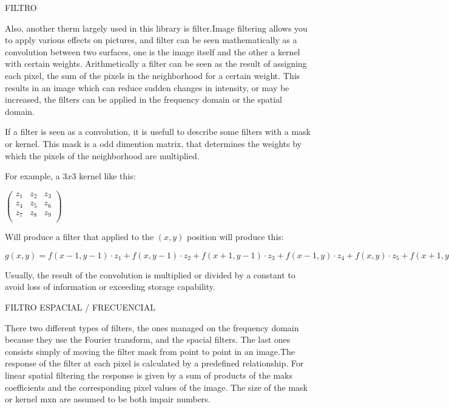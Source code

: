 \documentclass[a4paper]{article}
\begin{document}
FILTRO

Also, another therm largely used in this library is filter.Image filtering allows you to apply various effects on pictures, and filter can be seen mathematically as a convolution between two surfaces, one is the image itself and the other a kernel with certain weights.  Arithmetically a filter can be seen as the result of assigning each pixel, the sum of the pixels in the neighborhood for a certain weight. This results in an image which can reduce sudden changes in intensity, or may be increased, the filters can be applied in the frequency domain or the spatial domain. 

If a filter is seen as a convolution, it is usefull to describe some filters with a mask or kernel. This mask is a odd dimention matrix, that determines the weights by which the pixels of the neighborhood are multiplied.

For example, a $3x3$ kernel like this:
\begin{center}
\begin{math}
\begin{pmatrix}
	z_1 & z_2 & z_3 \\
    z_4 & z_5 & z_6 \\
    z_7 & z_8 & z_9 \\
\end{pmatrix}
\end{math}
\end{center}

Will produce a filter that applied to the $(x,y)$ position will produce this:
\begin{center}
\begin{math}
	g(x,y) = f(x-1,y-1)\cdot z_1 + f(x, y-1) \cdot z_2 + f(x+1,y-1)\cdot z_3 + f(x-1, y) \cdot z_4 + f(x,y) \cdot z_5 + f(x+1,y) \cdot z_6 + f(x-1, y+1) \cdot z_7 + f(x, y+1) \cdot z_8 + f(x+1, y+1) \cdot z_9
\end{math}
\end{center}

Usually, the result of the convolution is multiplied or divided by a constant to avoid loss of information or exceeding storage capability.


FILTRO ESPACIAL / FRECUENCIAL

There two different types of filters, the ones managed on the frequency domain because they use the Fourier transform, and the spacial filters. The last ones consists simply of moving the filter mask from point to point in an image.The response of the filter at each pixel is calculated by a predefined relationship. For linear spatial filtering  the response is given by a sum of products of the maks coefficients and the corresponding pixel values of the image. The size of the mask or kernel mxn are assumed to be both impair numbers.
\end{document}

